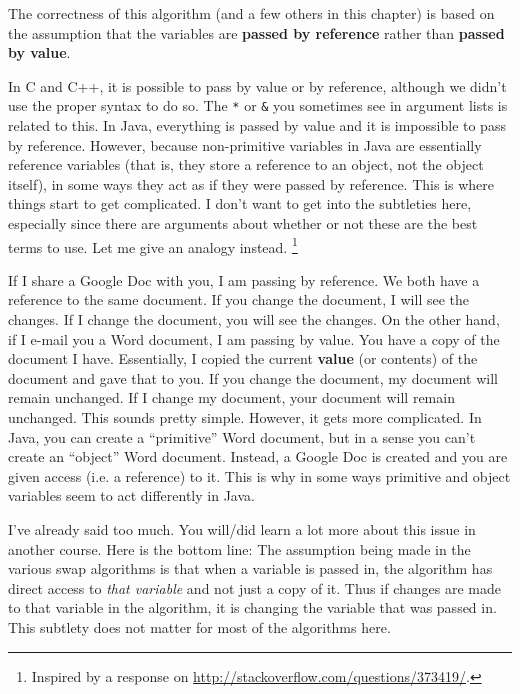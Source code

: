 \begin{rem}
The correctness of this algorithm (and a few others in this chapter)
is based on the assumption that the variables are 
{\bf passed by reference} rather than {\bf passed by value}.  

In C and C++, it is possible to pass by value or by reference, although we didn't use the
proper syntax to do so.  The \verb+*+ or \verb+&+ you sometimes
see in argument lists is related to this.
In Java, everything is passed by value and it is impossible to pass by reference.  
However, because non-primitive variables in Java are essentially reference variables 
(that is, they store a reference to an object, not the object itself), in some ways they act as if
they were passed by reference.
This is where things start to get complicated.
I don't want to get into the
subtleties here, especially since there are arguments about whether or not these are the best
terms to use.  Let me give an analogy instead.
\footnote{Inspired by a response on 
\url{http://stackoverflow.com/questions/373419/}.}

If I share a Google Doc with you, I am passing by reference.  
We both have a reference to the same document.
If you change the document, I will see the changes.  
If I change the document, you will see the changes.
On the other hand, if I e-mail you a Word document, I am passing by value.  
You have a copy of the document I have.  
Essentially, I copied the current {\bf value} (or contents) of the document
and gave that to you.
If you change the document, my document will remain unchanged.  
If I change my document, your document will remain unchanged.
This sounds pretty simple.  However, it gets more complicated.  
In Java, you can create a ``primitive'' Word document, 
but in a sense you can't create an ``object'' Word document.  
Instead, a Google Doc is created and you are given access (i.e. a reference) to it.
This is why in some ways primitive and object variables seem to act differently in Java.

I've already said too much.  
You will/did learn a lot more about this issue in another course.  
Here is the bottom line:  
The assumption being made in the various swap algorithms is that
when a variable is passed in, the algorithm has direct access to {\em that variable}
and not just a copy of it.  
Thus if changes are made to that variable in the algorithm, it is changing the variable that was
passed in.  This subtlety does not matter for most of the algorithms here.  
\end{rem}

